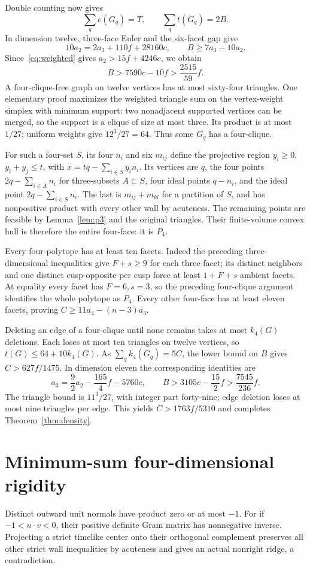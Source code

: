 \documentclass[11pt]{article}
\begin{document}
Double counting now gives
\[
 \sum_q e(G_q)=T,\qquad \sum_q t(G_q)=2B.
\]
In dimension twelve, three-face Euler and the six-facet gap give
\[
 10a_2=2a_3+110f+28160c,\qquad B\ge7a_3-10a_2.
\]
Since~\eqref{eq:weighted} gives $a_2>15f+4246c$, we obtain
\[
 B>7590c-10f>\frac{2515}{59}f.
\]
A four-clique-free graph on twelve vertices has at most sixty-four
triangles. One elementary proof maximizes the weighted triangle sum
on the vertex-weight simplex with minimum support: two nonadjacent
supported vertices can be merged, so the support is a clique of size
at most three. Its product is at most $1/27$; uniform weights give
$12^3/27=64$. Thus some $G_q$ has a four-clique.

For such a four-set $S$, its four $n_i$ and six $m_{ij}$ define the
projective region $y_i\ge0$, $y_i+y_j\le t$, with
$x=tq-\sum_{i\in S}y_i n_i$. Its vertices are $q$, the four points
$2q-\sum_{i\in A}n_i$ for three-subsets $A\subset S$, four ideal
points $q-n_i$, and the ideal point $2q-\sum_{i\in S}n_i$.
The last is $m_{ij}+m_{kl}$ for a partition of $S$, and has nonpositive
product with every other wall by acuteness. The remaining points are
feasible by Lemma~\ref{lem:p3} and the original triangles.
Their finite-volume convex hull is therefore the entire four-face:
it is $P_4$.

Every four-polytope has at least ten facets. Indeed the preceding
three-dimensional inequalities give $F+s\ge9$ for each three-facet;
its distinct neighbors and one distinct cusp-opposite per cusp force
at least $1+F+s$ ambient facets. At equality every facet has $F=6,s=3$,
so the preceding four-clique argument identifies the whole polytope
as $P_4$. Every other four-face has at least eleven facets, proving
$C\ge11a_4-(n-3)a_3$.

Deleting an edge of a four-clique until none remains takes at most
$k_4(G)$ deletions. Each loses at most ten triangles on twelve vertices,
so $t(G)\le64+10k_4(G)$. As $\sum_q k_4(G_q)=5C$, the lower bound on
$B$ gives $C>627f/1475$.
In dimension eleven the corresponding identities are
\[
 a_3=\frac92a_2-\frac{165}{4}f-5760c,\qquad
 B>3105c-\frac{15}{2}f>\frac{7545}{236}f.
\]
The triangle bound is $11^3/27$, with integer part forty-nine;
edge deletion loses at most nine triangles per edge.
This yields $C>1763f/5310$ and completes Theorem~\ref{thm:density}.

\section{Minimum-sum four-dimensional rigidity}
Distinct outward unit normals have product zero or at most $-1$.
For if $-1<u\cdot v<0$, their positive definite Gram matrix has
nonnegative inverse. Projecting a strict timelike center onto their
orthogonal complement preserves all other strict wall inequalities
by acuteness and gives an actual nonright ridge, a contradiction.
\end{document}
